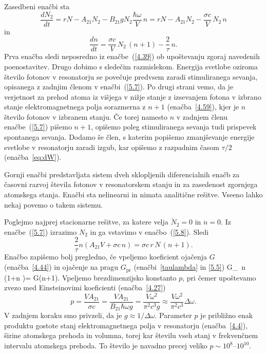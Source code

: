Zasedbeni enačbi sta
\begin{equation}
\frac{dN_2}{dt}=rN-A_{21}N_2-B_{21}gN_2\frac{\hbar \omega}{V}\,n
=rN-A_{21}N_2-\frac{\sigma c}{V}\, N_2\,n
\label{5.7}
\end{equation}
in 
\begin{equation}
\frac{dn}{dt}=\frac{\sigma c}{V}\, N_2\,(n+1)-\frac{2}{\tau}\,n.
\label{5.8}
\end{equation}
Prva enačba sledi neposredno iz enačbe~(\ref{4.39}) ob upoštevanju zgoraj navedenih
poenostavitev. Drugo  dobimo s sledečim razmislekom. Energija svetlobe 
oziroma število fotonov v resonatorju se povečuje predvsem 
zaradi stimuliranega sevanja, opisanega z zadnjim členom v enačbi~(\ref{5.7}).
Po drugi strani vemo, da je verjetnost za prehod atoma iz višjega v nižje stanje z 
izsevanjem fotona v izbrano stanje elektromagnetnega polja sorazmerna z 
$n+1$ (enačba~\ref{4.59}), kjer je $n$ število fotonov v izbranem stanju. 
Če torej namesto $n$ v zadnjem členu enačbe~(\ref{5.7}) pišemo $n+1$, 
opišemo poleg stimuliranega sevanja tudi prispevek spontanega sevanja. Dodamo še 
člen, s katerim popišemo zmanjševanje energije svetlobe v resonatorju zaradi 
izgub, kar opišemo z razpadnim časom $\tau/2$ (enačba~\ref{eq:dW}). 

Gornji enačbi predstavljata sistem dveh sklopljenih diferencialnih enačb za 
časovni razvoj števila fotonov v resonatorskem stanju in za zasedenost 
zgornjega atomskega stanja. Enačbi sta nelinearni in nimata  
analitične rešitve. Vseeno lahko nekaj povemo o takem sistemu.

Poglejmo najprej stacionarne rešitve, za katere velja $\dot{N}_{2}=0$ in 
$\dot{n}=0$. Iz enačbe~(\ref{5.7}) izrazimo $N_{2}$ in ga vstavimo v enačbo~(\ref{5.8}).
Sledi 
\begin{equation}
\frac{2}{\tau }n\left(A_{21}V+\sigma c\,n\right)=
\sigma c\, r\,N\,(n+1).
\label{5.9}
\end{equation}
Enačbo zapišemo bolj pregledno, če vpeljemo koeficient ojačenja $G$ (enačba~\ref{4.44})
in ojačenje na pragu $G_\mathrm{pr}$ (enačbi~\ref{taulambda} in \ref{5.5})
\beq
G_\, n\, \left(1+n \right)= G(n+1).
\label{5.9.a}
\eeq
Vpeljemo brezdimenzijsko konstanto $p$, pri čemer upoštevamo zvezo
med Einsteinovimi koeficienti (enačba~\ref{4.27})
\begin{equation}
p=\frac{VA_{21}}{\sigma c} = 
\frac{VA_{21}}{B_{21}\hbar \omega g}=\frac{V\omega ^{2}}{\pi
^{2}c^{3}g}\approx
\frac{V\omega ^{2}}{\pi ^{2}c^{3}}\Delta \omega.  
\label{5.10}
\end{equation}
V zadnjem koraku smo privzeli, da je $g\approx 1/\Delta \omega $. 
Parameter $p$ je približno enak produktu 
gostote stanj elektromagnetnega polja v resonatorju (enačba~\ref{4.4}),
širine atomskega prehoda in volumna, torej kar številu vseh stanj 
v frekvenčnem intervalu atomskega prehoda. To število je navadno precej 
veliko $p \sim 10^{8}$--$10^{10}$. 

